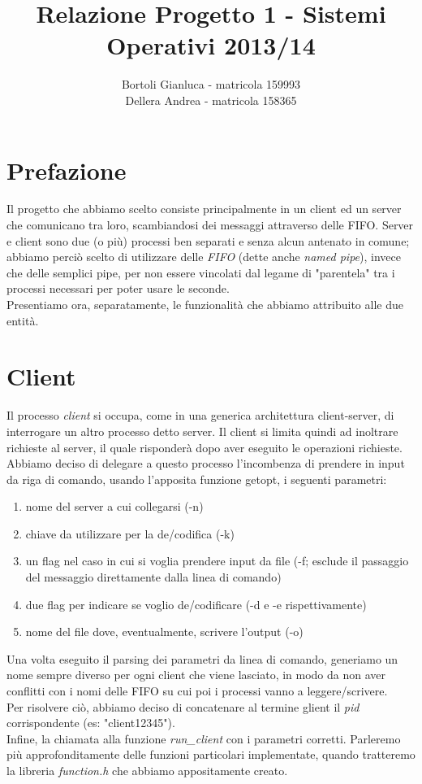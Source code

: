 \documentclass[a4paper,9pt]{article}
\begin{document}
\author{Bortoli Gianluca - matricola 159993\\Dellera Andrea - matricola 158365}
\title{Relazione Progetto 1 - Sistemi Operativi 2013/14}
\maketitle
\pagebreak

\section{Prefazione}
Il progetto che abbiamo scelto consiste principalmente in un client ed un server che comunicano tra loro, scambiandosi dei messaggi attraverso delle FIFO. Server e client sono due (o più) processi ben separati e senza alcun antenato in comune; abbiamo perciò scelto di utilizzare delle \emph{FIFO} (dette anche \emph{named pipe}), invece che delle semplici pipe, per non essere vincolati dal legame di "parentela" tra i processi necessari per poter usare le seconde.\\
Presentiamo ora, separatamente, le funzionalità che abbiamo attribuito alle due entità.

\section{Client}
Il processo \emph{client} si occupa, come in una generica architettura client-server, di interrogare un altro processo detto server. Il client si limita quindi ad inoltrare richieste al server, il quale risponderà dopo aver eseguito le operazioni richieste.\\
Abbiamo deciso di delegare a questo processo l'incombenza di prendere in input da riga di comando, usando l'apposita funzione getopt, i seguenti parametri:
\begin{enumerate}
\item nome del server a cui collegarsi (-n)
\item chiave da utilizzare per la de/codifica (-k)
\item un flag nel caso in cui si voglia prendere input da file (-f; esclude il passaggio del messaggio direttamente dalla linea di comando)
\item due flag per indicare se voglio de/codificare (-d e -e rispettivamente)
\item nome del file dove, eventualmente, scrivere l'output (-o)
\end{enumerate}
Una volta eseguito il parsing dei parametri da linea di comando, generiamo un nome sempre diverso per ogni client che viene lasciato, in modo da non aver conflitti con i nomi delle FIFO su cui poi i processi vanno a leggere/scrivere.\\
Per risolvere ciò, abbiamo deciso di concatenare al termine glient il \emph{pid} corrispondente (es: "client12345").\\
Infine, la chiamata alla funzione \emph{run\_client} con i parametri corretti. Parleremo più approfonditamente delle funzioni particolari implementate, quando tratteremo la libreria \emph{function.h} che abbiamo appositamente creato.
\end{document}
